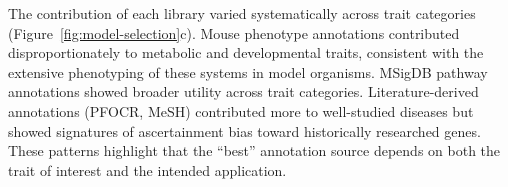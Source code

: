 The contribution of each library varied systematically across trait categories (Figure~\ref{fig:model-selection}c). Mouse phenotype annotations contributed disproportionately to metabolic and developmental traits, consistent with the extensive phenotyping of these systems in model organisms. MSigDB pathway annotations showed broader utility across trait categories. Literature-derived annotations (PFOCR, MeSH) contributed more to well-studied diseases but showed signatures of ascertainment bias toward historically researched genes. These patterns highlight that the ``best'' annotation source depends on both the trait of interest and the intended application.


